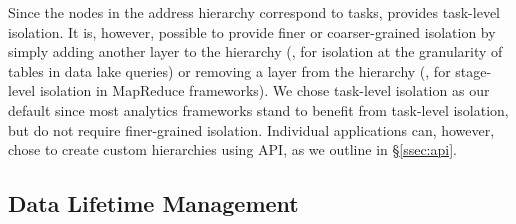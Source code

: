  Since the nodes in the address hierarchy correspond to tasks, \jiffy provides task-level isolation. It is, however, possible to provide finer or coarser-grained isolation by simply adding another layer to the hierarchy (\eg, for isolation at the granularity of tables in data lake queries) or removing a layer from the hierarchy (\eg, for stage-level isolation in MapReduce frameworks). We chose task-level isolation as our default since most analytics frameworks stand to benefit from task-level isolation, but do not require finer-grained isolation. Individual applications can, however, chose to create custom hierarchies using \jiffy API, as we outline in \S\ref{ssec:api}.

\subsection{Data Lifetime Management}
\label{ssec:mlm}

